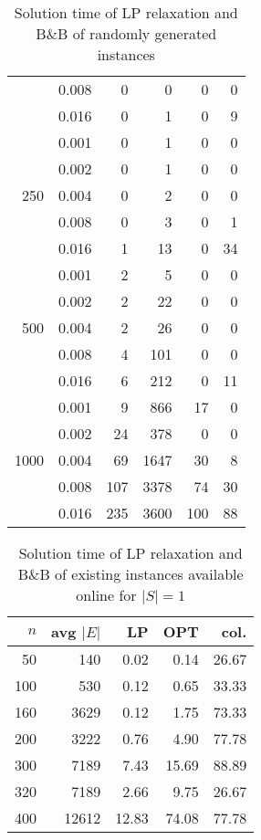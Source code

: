 \begin{table}[]
\begin{minipage}{.45\linewidth}
\begin{tabular}{rrrrrr}
& 0.008 &  0  &  0 &  0  &  0\\
& 0.016 &  0  &  1 &  0  &  9\\ 
\hline
\multirow{5}{*}{250} 
& 0.001 &  0  &  1 & 0   & 0 \\
& 0.002 &  0  &  1 & 0   & 0 \\
& 0.004 &  0  &  2 & 0   & 0 \\
& 0.008 &  0  &  3 & 0   & 1 \\
& 0.016 &  1  & 13 & 0   &34 \\
\hline
\multirow{5}{*}{500} 
& 0.001 &  2  &  5 & 0   & 0 \\
& 0.002 &  2  & 22 & 0   & 0 \\
& 0.004 &  2  & 26 & 0   & 0 \\
& 0.008 &  4  &101 & 0   & 0 \\
& 0.016 &  6  &212 & 0   &11 \\
\hline
\multirow{5}{*}{1000} 
& 0.001 &  9  &866   & 17 & 0  \\
& 0.002 &  24 &378   & 0  & 0  \\
& 0.004 &  69 &1647  & 30 & 8  \\
& 0.008 &  107&3378  & 74 &30  \\
& 0.016 &  235&3600  &100 &88 
\end{tabular}
\end{minipage}
\caption{Solution time of LP relaxation and B\&B of randomly generated instances}
\label{tab:soltime}
\end{table}
			 

\begin{table}[]
	\centering
\begin{tabular}{rrrrr}
$n$ & avg $|E|$ & LP  & OPT &  col. \\
\hline
  50 & 140  & 0.02&0.14 & 26.67\\
 100 & 530  & 0.12&0.65 & 33.33\\
 160 &3629  & 0.12&1.75 & 73.33\\
 200 &3222  & 0.76&4.90 & 77.78\\
 300 &7189  & 7.43&15.69& 88.89\\
 320 &7189  & 2.66& 9.75& 26.67\\
 400 &12612 &12.83&74.08& 77.78
\end{tabular}
\caption{Solution time of LP relaxation and B\&B of existing instances available online for $|S|=1$}
\label{tab:soltime-exist}
\end{table}

